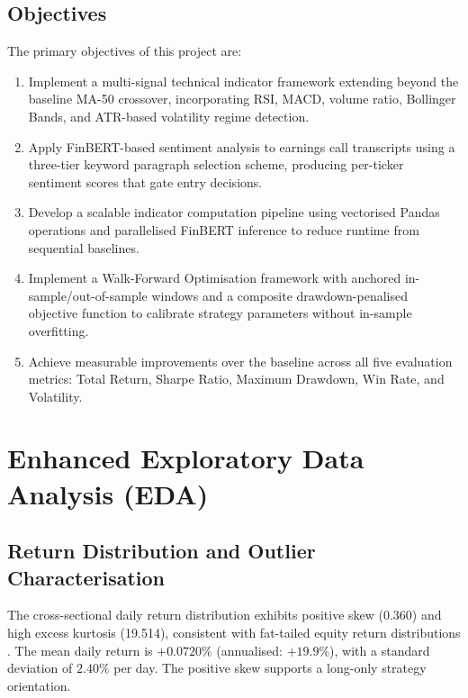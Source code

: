 \documentclass[11pt,twoside,a4paper]{article}
\begin{document}
\subsection{Objectives}

The primary objectives of this project are:
\begin{enumerate}[(1)]
    \item Implement a multi-signal technical indicator framework extending beyond the baseline MA-50 crossover, incorporating RSI, MACD, volume ratio, Bollinger Bands, and ATR-based volatility regime detection.
    \item Apply FinBERT-based sentiment analysis to earnings call transcripts using a three-tier keyword paragraph selection scheme, producing per-ticker sentiment scores that gate entry decisions.
    \item Develop a scalable indicator computation pipeline using vectorised Pandas operations and parallelised FinBERT inference to reduce runtime from sequential baselines.
    \item Implement a Walk-Forward Optimisation framework with anchored in-sample/out-of-sample windows and a composite drawdown-penalised objective function to calibrate strategy parameters without in-sample overfitting.
    \item Achieve measurable improvements over the baseline across all five evaluation metrics: Total Return, Sharpe Ratio, Maximum Drawdown, Win Rate, and Volatility.
\end{enumerate}




\clearpage
\section{Enhanced Exploratory Data Analysis (EDA)}

\subsection{Return Distribution and Outlier Characterisation}

The cross-sectional daily return distribution exhibits positive skew (0.360) and high excess kurtosis (19.514), consistent with fat-tailed equity return distributions \citep{Cont2001}. The mean daily return is $+0.0720\%$ (annualised: $+19.9\%$), with a standard deviation of $2.40\%$ per day. The positive skew supports a long-only strategy orientation.
\end{document}
